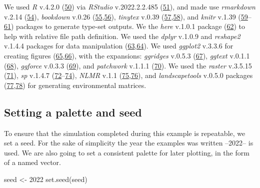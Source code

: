 \documentclass[10pt,a4paper]{article}
\newenvironment{Shaded}{}{}
\newcommand{\DecValTok}[1]{#1}
\newcommand{\FunctionTok}[1]{#1}
\newcommand{\NormalTok}[1]{#1}
\newcommand{\OtherTok}[1]{#1}
\begin{document}
We used \emph{R} v.4.2.0 (\protect\hyperlink{ref-R-base}{50}) via \emph{RStudio} v.2022.2.2.485 (\protect\hyperlink{ref-RStudioTeam2021}{51}), and made use \emph{rmarkdown} v.2.14 (\protect\hyperlink{ref-rmarkdown2020}{54}), \emph{bookdown} v.0.26 (\protect\hyperlink{ref-bookdown2016}{55},\protect\hyperlink{ref-R-bookdown}{56}), \emph{tinytex} v.0.39 (\protect\hyperlink{ref-tinytex2019}{57},\protect\hyperlink{ref-R-tinytex}{58}), and \emph{knitr} v.1.39 (\protect\hyperlink{ref-knitr2015}{59}--\protect\hyperlink{ref-R-knitr}{61}) packages to generate type-set outputs.
We the \emph{here} v.1.0.1 package (\protect\hyperlink{ref-R-here}{62}) to help with relative file path definition.
We used the \emph{dplyr} v.1.0.9 and \emph{reshape2} v.1.4.4 packages for data manipulation (\protect\hyperlink{ref-R-dplyr}{63},\protect\hyperlink{ref-reshape22007}{64}).
We used \emph{ggplot2} v.3.3.6 for creating figures (\protect\hyperlink{ref-R-ggplot2}{65},\protect\hyperlink{ref-ggplot22016}{66}), with the expansions: \emph{ggridges} v.0.5.3 (\protect\hyperlink{ref-R-ggridges}{67}), \emph{ggtext} v.0.1.1 (\protect\hyperlink{ref-R-ggtext}{68}), \emph{ggforce} v.0.3.3 (\protect\hyperlink{ref-R-ggforce}{69}), and \emph{patchwork} v.1.1.1 (\protect\hyperlink{ref-R-patchwork}{70}).
We used the \emph{raster} v.3.5.15 (\protect\hyperlink{ref-R-raster}{71}), \emph{sp} v.1.4.7 (\protect\hyperlink{ref-sp2013}{72}--\protect\hyperlink{ref-R-sp}{74}), \emph{NLMR} v.1.1 (\protect\hyperlink{ref-NLMR2018}{75},\protect\hyperlink{ref-R-NLMR}{76}), and \emph{landscapetools} v.0.5.0 packages (\protect\hyperlink{ref-landscapetools2018}{77},\protect\hyperlink{ref-R-landscapetools}{78}) for generating environmental matrices.

\hypertarget{setting-a-palette-and-seed}{%
\subsection{Setting a palette and seed}\label{setting-a-palette-and-seed}}

To ensure that the simulation completed during this example is repeatable, we set a seed.
For the sake of simplicity the year the examples was written --2022-- is used.
We are also going to set a consistent palette for later plotting, in the form of a named vector.

\begin{Shaded}
\begin{Highlighting}[]
\NormalTok{seed }\OtherTok{\textless{}{-}} \DecValTok{2022}
\FunctionTok{set.seed}\NormalTok{(seed)}
\end{Highlighting}
\end{Shaded}
\end{document}
